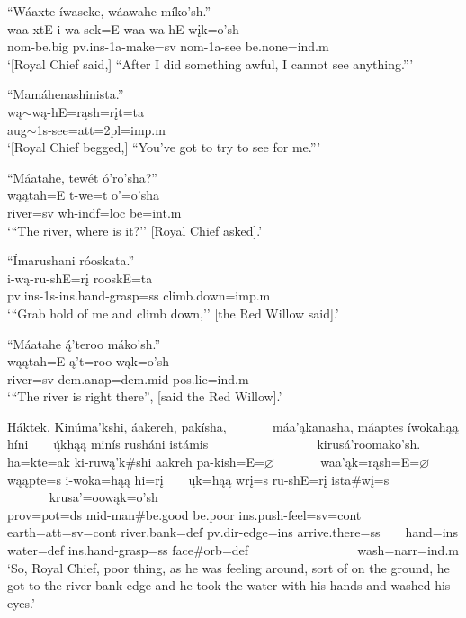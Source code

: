 \begin{exe}
\item\label{EJ102} \glll ``Wáaxte íwaseke, wáawahe míko'sh.''\\
waa-xtE i-wa-sek=E waa-wa-hE wįk=o'sh\\
nom-\textnormal{be.big} pv.ins-1a-\textnormal{make}=sv nom-1a-\textnormal{see} \textnormal{be.none}=ind.m\\
\glt `[Royal Chief said,] {``}After I did something awful, I cannot see anything.{''}'

\item\label{EJ103} \glll``Mamáhenashinista.''\\
wą$\sim$wą-hE=rąsh=rįt=ta\\
aug$\sim$1s-\textnormal{see}=att=2pl=imp.m\\
\glt `[Royal Chief begged,] ``You've got to try to see for me.{''}'

\item\label{EJ104} \glll ``Máatahe, tewét ó'ro'sha?''\\
wąątah=E t-we=t o'=o'sha\\
\textnormal{river}=sv wh-indf=loc \textnormal{be}=int.m\\
\glt `{``}The river, where is it?'' [Royal Chief asked].'

\item\label{EJ105} \glll ``Ímarushani róoskata.''\\
i-wą-ru-shE=rį rooskE=ta\\
pv.ins-1s-ins.hand-\textnormal{grasp}=ss \textnormal{climb.down}=imp.m\\
\glt `{``}Grab hold of me and climb down,'' [the Red Willow said].'

\item\label{EJ106} \glll ``Máatahe ą́'teroo máko'sh.''\\
wąątah=E ą't=roo wąk=o'sh\\
\textnormal{river}=sv dem.anap=dem.mid pos.lie=ind.m\\
\glt `{``}The river is right there{''}, [said the Red Willow].'

\item\label{EJ107} \glll Háktek, Kinúma'kshi, áakereh, pakísha, ~ ~ ~ ~ máa'ąkanasha, máaptes íwokahąą híni ~ ~ ų́khąą minís rusháni istámis ~ ~ ~ ~ ~ ~ ~ ~ ~ ~ kirusá'roomako'sh.\\
ha=kte=ak ki-ruwą'k\#shi aakreh pa-kish=E=$\varnothing$ ~ ~ ~ ~ waa'ąk=rąsh=E=$\varnothing$ wąąpte=s i-woka=hąą hi=rį ~ ~ ųk=hąą wrį=s ru-shE=rį ista\#wį=s ~ ~ ~ ~ ~ ~ ~ ~ ~ ~ krusa'=oowąk=o'sh\\
prov=pot=ds mid-\textnormal{man}\#\textnormal{be.good} \textnormal{be.poor} ins.push-\textnormal{feel}=sv=cont ~ ~ ~ ~ \textnormal{earth}=att=sv=cont \textnormal{river.bank}=def pv.dir-\textnormal{edge}=ins \textnormal{arrive.there}=ss ~ ~ \textnormal{hand}=ins \textnormal{water}=def ins.hand-\textnormal{grasp}=ss \textnormal{face}\#\textnormal{orb}=def ~ ~ ~ ~ ~ ~ ~ ~ ~ ~ \textnormal{wash}=narr=ind.m\\
\glt `So, Royal Chief, poor thing, as he was feeling around, sort of on the ground, he got to the river bank edge and he took the water with his hands and washed his eyes.'


\end{exe}
